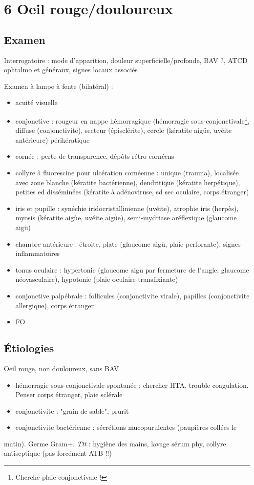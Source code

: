 \documentclass[11pt]{article}
\begin{document}
\section{6 Oeil rouge/douloureux}
\label{sec:org16467d8}
\subsection{Examen}
\label{sec:orgc7c89ea}
Interrogatoire : mode d'apparition, douleur superficielle/profonde, BAV
   ?, ATCD ophtalmo et généraux, signes locaux associés

Examen à lampe à fente (bilatéral) :
\begin{itemize}
\item acuité visuelle
\item conjonctive : rougeur en nappe hémorragique (hémorragie
sous-conjonctivale\footnote{Cherche plaie conjonctivale !}, diffuse (conjonctivite), secteur (épisclérite),
cercle (kératite aigüe, uvéite antérieure)
périkératique
\item cornée : perte de transparence, dépôts rétro-cornéens
\item collyre à fluorescine pour ulcération cornéenne : unique (trauma), localisée
avec zone blanche (kératite bactérienne), dendritique (kératite herpétique),
petites ed disséminées (kératite à adénoviruse, sd sec oculaire, corps
étranger)
\item iris et pupille : synéchie iridocristallinienne (uvéite), atrophie iris
(herpès), myosis (kératite aigùe, uvéite aigǜe), semi-mydriase
aréflexique (glaucome aigü)
\item chambre antérieure : étroite, plate (glaucome aigù, plaie perforante), signes inflammatoires
\item tonus oculaire : hypertonie (glaucome aigu par fermeture de l'angle, glaucome
néovasculaire), hypotonie (plaie oculaire transfixiante)
\item conjonctive palpébrale : follicules (conjonctivite virale), papilles
(conjonctivite allergique), corps étranger
\item FO
\end{itemize}

\subsection{Étiologies}
\label{sec:org5388b9f}
Oeil rouge, non douloureux, sans BAV
\begin{itemize}
\item hémorragie sous-conjonctivale spontanée : chercher HTA, trouble
coagulation. Penser corps étranger, plaie sclérale \danger
\item conjonctivite : "grain de sable", prurit
\item conjonctivite  bactérienne : sécrétions mucopurulentes (paupières collées le
\end{itemize}
matin). Germe Gram+. \emph{Ttt} : hygiène des mains, lavage sérum phy, collyre
antiseptique (pas forcément ATB !!)
\end{document}
